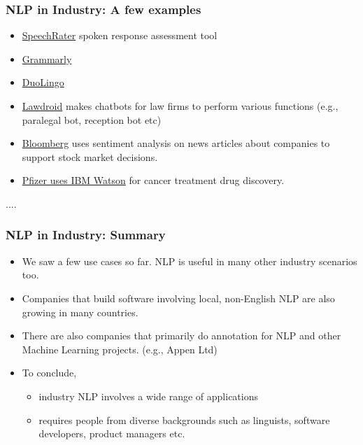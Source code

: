 \documentclass{beamer}
\begin{document}
\begin{frame}
\frametitle{NLP in Industry: A few examples}
\begin{itemize}
    \item \href{https://www.ets.org/accelerate/ai-portfolio/speechrater}{SpeechRater} spoken response assessment tool
    \item \href{https://www.grammarly.com/}{Grammarly}
    \item \href{https://www.duolingo.com}{DuoLingo}
    \item \href{https://lawdroid.com/}{Lawdroid} makes chatbots for law firms to perform various functions (e.g., paralegal bot, reception bot etc)
    \item \href{https://www.bloomberg.com/}{Bloomberg} uses sentiment analysis on news articles about companies to support stock market decisions.
    \item \href{https://www.pfizer.com/news/press-release/press-release-detail/ibm_and_pfizer_to_accelerate_immuno_oncology_research_with_watson_for_drug_discovery}{Pfizer uses IBM Watson} for cancer treatment drug discovery.
\end{itemize}
.... 
\end{frame}

\begin{frame}
\frametitle{NLP in Industry: Summary}
\begin{itemize}
    \item We saw a few use cases so far. NLP is useful in many other industry scenarios too. 
    \item Companies that build software involving local, non-English NLP are also growing in many countries.  
    \item There are also companies that primarily do annotation for NLP and other Machine Learning projects. (e.g., Appen Ltd)
\pause \item To conclude, 
\begin{itemize}
    \item industry NLP involves a wide range of applications
    \item requires people from diverse backgrounds such as linguists, software developers, product managers etc. 
\end{itemize}
\end{itemize}
\end{frame}
\end{document}
